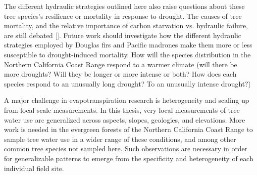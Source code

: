 The different hydraulic strategies outlined here also raise questions about these tree species's resilience or mortality in response to drought.  The causes of tree mortality, and the relative importance of carbon starvation vs. hydraulic failure, are still debated [\cite{sala2010physiological}].  Future work should investigate how the different hydraulic strategies employed by Douglas firs and Pacific madrones make them more or less susceptible to drought-induced mortality.  How will the species distribution in the Northern California Coast Range respond to a warmer climate (will there be more droughts? Will they be longer or more intense or both?  How does each species respond to an unusually long drought?  To an unusually intense drought?)

A major challenge in evapotranspiration research is heterogeneity and scaling up from local-scale measurements.  In this thesis, very local measurements of tree water use are generalized across aspects, slopes, geologies, and elevations.  More work is needed in the evergreen forests of the Northern California Coast Range to sample tree water use in a wider range of these conditions, and among other common tree species not sampled here.  Such observations are necessary in order for generalizable patterns to emerge from the specificity and heterogeneity of each individual field site.

